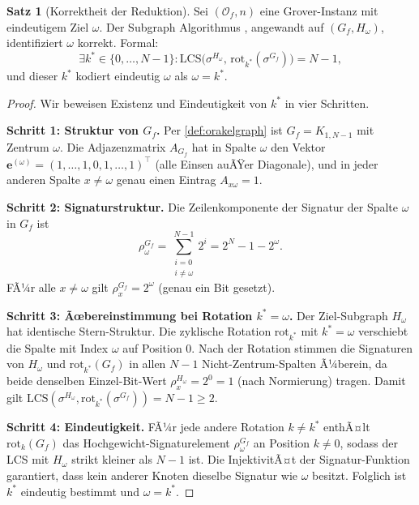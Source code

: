 ﻿\documentclass[11pt,a4paper]{article}
\theoremstyle{definition}
\newtheorem{theorem}{Satz}[section]
\begin{document}
\begin{theorem}[Korrektheit der Reduktion]
\label{thm:korrektheit}
  Sei $(\mathcal{O}_f, n)$ eine Grover-Instanz mit eindeutigem Ziel $\omega$.
  Der Subgraph Algorithmus \cite{Epp2026}, angewandt auf $(G_f, H_\omega)$,
  identifiziert $\omega$ korrekt.  Formal:
  \begin{equation}
    \exists k^* \in \{0,\ldots,N-1\} \colon
    \mathrm{LCS}\!\bigl(\sigma^{H_\omega},\, \mathrm{rot}_{k^*}(\sigma^{G_f})\bigr)
    = N-1,
    \label{eq:lcs_bedingung}
  \end{equation}
  und dieser $k^*$ kodiert eindeutig $\omega$ als $\omega = k^*$.
\end{theorem}

\begin{proof}
  Wir beweisen Existenz und Eindeutigkeit von $k^*$ in vier Schritten.

  \textbf{Schritt 1: Struktur von $G_f$.}
  Per \cref{def:orakelgraph} ist $G_f = K_{1,N-1}$ mit Zentrum $\omega$.
  Die Adjazenzmatrix $A_{G_f}$ hat in Spalte $\omega$ den Vektor
  $\mathbf{e}^{(\omega)} = (1,\ldots,1,0,1,\ldots,1)^\top$ (alle Einsen
  auÃŸer Diagonale), und in jeder anderen Spalte $x \neq \omega$ genau
  einen Eintrag $A_{x\omega} = 1$.

  \textbf{Schritt 2: Signaturstruktur.}
  Die Zeilenkomponente der Signatur der Spalte $\omega$ in $G_f$ ist
  \begin{equation}
    \rho_\omega^{G_f} = \sum_{\substack{i=0 \\ i \neq \omega}}^{N-1} 2^i
    = 2^N - 1 - 2^\omega.
    \label{eq:rho_omega}
  \end{equation}
  FÃ¼r alle $x \neq \omega$ gilt $\rho_x^{G_f} = 2^\omega$ (genau ein Bit gesetzt).

  \textbf{Schritt 3: Ãœbereinstimmung bei Rotation $k^* = \omega$.}
  Der Ziel-Subgraph $H_\omega$ hat identische Stern-Struktur.  Die zyklische
  Rotation $\mathrm{rot}_{k^*}$ mit $k^* = \omega$ verschiebt die Spalte mit
  Index $\omega$ auf Position 0.  Nach der Rotation stimmen die Signaturen
  von $H_\omega$ und $\mathrm{rot}_{k^*}(G_f)$ in allen $N-1$ Nicht-Zentrum-Spalten
  Ã¼berein, da beide denselben Einzel-Bit-Wert $\rho^{H_\omega}_x = 2^0 = 1$ (nach
  Normierung) tragen.  Damit gilt
  $\mathrm{LCS}(\sigma^{H_\omega}, \mathrm{rot}_{k^*}(\sigma^{G_f})) = N-1 \geq 2$.

  \textbf{Schritt 4: Eindeutigkeit.}
  FÃ¼r jede andere Rotation $k \neq k^*$ enthÃ¤lt $\mathrm{rot}_k(G_f)$ das
  Hochgewicht-Signaturelement $\rho_\omega^{G_f}$ an Position $k \neq 0$,
  sodass der LCS mit $H_\omega$ strikt kleiner als $N-1$ ist.  Die
  InjektivitÃ¤t der Signatur-Funktion \cite{Epp2026} garantiert, dass kein
  anderer Knoten dieselbe Signatur wie $\omega$ besitzt.  Folglich ist $k^*$
  eindeutig bestimmt und $\omega = k^*$.
\end{proof}
\end{document}
